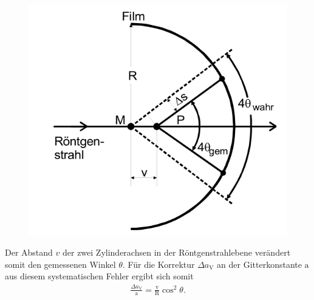 \begin{figure}
  \centering
  \includegraphics{Syst_error_2.PNG}
  \caption{  }
  \label{fig:error2}
\end{figure}
Der Abstand $v$ der zwei Zylinderachsen in der Röntgenstrahlebene
verändert somit den gemessenen Winkel $\theta$.
Für die Korrektur $\Delta a_\mathrm{V}$ an der Gitterkonstante $\mathrm{a}$
aus diesem systematischen Fehler ergibt sich somit
\begin{align}
  \frac{\Delta a_\mathrm{V}}{\mathrm{a}}=\frac{\mathrm{v}}{\mathrm{R}} \cos^2 \theta. \label{eqn:sys2}
\end{align}
